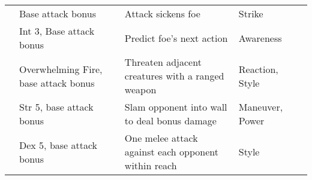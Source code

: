 {\begin{longtabu}{>{\lcol}p{10em} >{\lcol}p{15em} >{\lcol}X >{\lcol}p{6em} >{\lcol}p{3em}}
         & Base attack bonus  & Attack sickens foe & Strike &  \\
         & Int 3, Base attack bonus  & Predict foe's next action & Awareness &  \\
         & Overwhelming Fire, base attack bonus  & Threaten adjacent creatures with a ranged weapon & Reaction, Style &  \\
         & Str 5, base attack bonus  & Slam opponent into wall to deal bonus damage & Maneuver, Power &  \\
         & Dex 5, base attack bonus  & One melee attack against each opponent within reach & Style &  \\


\end{longtabu}}
